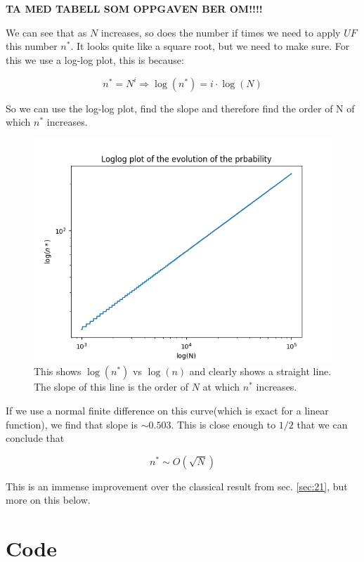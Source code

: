 \documentclass[a4paper,norsk, 10pt]{article}
\begin{document}
\textbf{TA MED TABELL SOM OPPGAVEN BER OM!!!!}


We can see that as $N$ increases, so does the number if times we need to apply $UF$ this number $n^*$. It looks quite like a square root, but we need to make sure. For this we use a log-log plot, this is because:

\begin{equation}
n^* = N^i \Rightarrow \log(n^*) = i\cdot \log(N)
\end{equation}

So we can use the log-log plot, find the slope and therefore find the order of N of which $n^*$ increases.


\begin{figure}[H]
\centering
\includegraphics[scale=0.5]{logpi.png}
\caption{This shows $\log(n^*)$ vs $\log(n)$ and clearly shows a straight line. The slope of this line is the order of $N$ at which $n^*$ increases.}
\end{figure}


If we use a normal finite difference on this curve(which is exact for a linear function), we find that slope is $\sim 0.503$. This is close enough to $1/2$ that we can conclude that

\begin{equation}
n^* \sim O(\sqrt{N})
\end{equation}

This is an immense improvement over the classical result from sec. \ref{sec:21}, but more on this below.


\section{Code}\label{sec:code}

\end{document}
